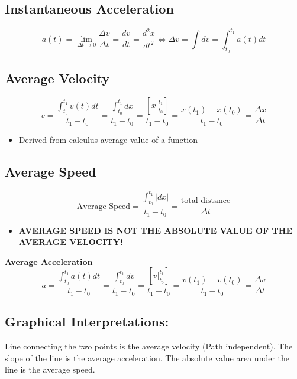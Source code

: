 \documentclass[article, 11pt]{article}
\theoremstyle{definition}
\begin{document}
    \subsection{Instantaneous Acceleration}
    \begin{equation}
        a(t) = \lim_{\Delta t \to 0} \frac{\Delta v}{\Delta t} = \frac{dv}{dt} = \frac{d^2 x}{dt^2} \iff \Delta v = \int dv = \int_{t_0}^{t_1} a(t) dt
        \label{eq:instantaneous acceleration}
    \end{equation}
    \subsection{Average Velocity}
        \begin{equation}
            \overline{v} = \frac{\displaystyle \int_{t_0}^{t_1} v(t) dt}{t_1 - t_0} = \frac{\displaystyle\int_{t_0}^{t_1} dx}{t_1 - t_0} = \frac{\left[x \biggr\rvert_{t_0}^{t_1}\right]}{t_1 - t_0} = \frac{x(t_1) - x(t_0)}{t_1 - t_0} = \frac{\Delta x}{\Delta t}
            \label{eq:average velocity}
        \end{equation}
        \begin{itemize}
            \item Derived from calculus average value of a function
        \end{itemize}
        \subsection{Average Speed}
        \begin{equation}
            \text{Average Speed} = \frac{\displaystyle \int_{t_0}^{t_1} |dx|}{t_1 - t_0} = \frac{\text{total distance}}{\Delta t}
            \label{eq:average speed}
        \end{equation}
        \begin{itemize}
            \item \textbf{AVERAGE SPEED IS NOT THE ABSOLUTE VALUE OF THE AVERAGE VELOCITY!}
        \end{itemize}
        \textbf{Average Acceleration}
        \begin{equation}
            \overline{a} = \frac{\displaystyle \int_{t_0}^{t_1} a(t) dt}{t_1 - t_0} = \frac{\displaystyle\int_{t_0}^{t_1} dv}{t_1 - t_0} = \frac{\left[v \biggr\rvert_{t_0}^{t_1}\right]}{t_1 - t_0} = \frac{v(t_1) - v(t_0)}{t_1 - t_0} = \frac{\Delta v}{\Delta t}
            \label{eq:average acceleration}
        \end{equation}
        \subsection{Graphical Interpretations:} Line connecting the two points is the average velocity (Path independent). The slope of the line is the average acceleration. The absolute value area under the line is the average speed.
\end{document}
